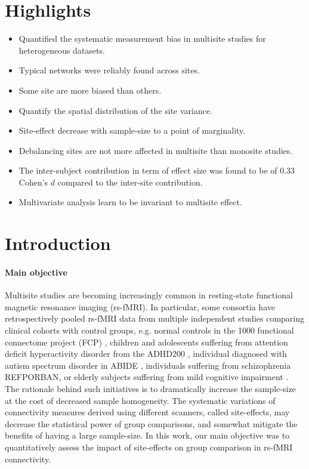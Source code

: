\documentclass[authoryear]{elsarticle}
\begin{document}

\section*{Highlights}

\begin{itemize}
\item Quantified the systematic measurement bias in multisite studies for heterogeneous datasets. 
\item Typical networks were reliably found across sites.
\item Some site are more biased than others.
\item Quantify the spatial distribution of the site variance.
\item Site-effect decrease with sample-size to a point of marginality.
\item Debalancing sites are not more affected in multisite than monosite studies.
\item The inter-subject contribution in term of effect size was found to be of 0.33 Cohen's $d$ compared to the inter-site contribution.
\item Multivariate analysis learn to be invariant to multisite effect.
\end{itemize}

\section{Introduction}

\paragraph{Main objective}
Multisite studies are becoming increasingly common in resting-state functional magnetic resonance imaging (rs-fMRI). In particular, some consortia have retrospectively pooled rs-fMRI data from multiple independent studies comparing clinical cohorts with control groups, e.g. normal controls in the 1000 functional connectome project (FCP) \citep{Biswal2010}, children and adolescents suffering from attention deficit hyperactivity disorder from the ADHD200 \citep{ADHD200,Fair2012}, individual diagnosed with autism spectrum disorder in ABIDE \citep{Nielsen2013}, individuals suffering from schizophrenia REFPORBAN, or elderly subjects suffering from mild cognitive impairment \citep{Tam2015}. The rationale behind such initiatives is to dramatically increase the sample-size at the cost of decreased sample homogeneity. The systematic variations of connectivity measures derived using different scanners, called site-effects, may decrease the statistical power of group comparisons, and somewhat mitigate the benefits of having a large sample-size. In this work, our main objective was to quantitatively assess the impact of site-effects on group comparison in rs-fMRI connectivity.
\end{document}
